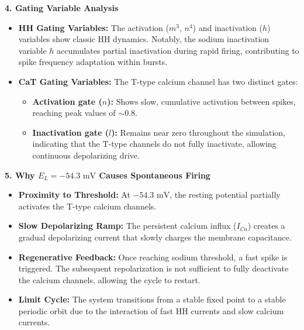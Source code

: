\documentclass{article}
\begin{document}
\begin{answerbox}
\textbf{4. Gating Variable Analysis}
\begin{itemize}
    \item \textbf{HH Gating Variables:} The activation ($m^3$, $n^4$) and inactivation ($h$) variables show classic HH dynamics. Notably, the sodium inactivation variable $h$ accumulates partial inactivation during rapid firing, contributing to spike frequency adaptation within bursts.
    \item \textbf{CaT Gating Variables:} The T-type calcium channel has two distinct gates:
    \begin{itemize}
        \item \textbf{Activation gate ($n$):} Shows slow, cumulative activation between spikes, reaching peak values of $\sim 0.8$.
        \item \textbf{Inactivation gate ($l$):} Remains near zero throughout the simulation, indicating that the T-type channels do not fully inactivate, allowing continuous depolarizing drive.
    \end{itemize}
\end{itemize}

\textbf{5. Why $E_L = -54.3 \text{ mV}$ Causes Spontaneous Firing}
\begin{itemize}
    \item \textbf{Proximity to Threshold:} At $-54.3 \text{ mV}$, the resting potential partially activates the T-type calcium channels.
    \item \textbf{Slow Depolarizing Ramp:} The persistent calcium influx ($I_{Ca}$) creates a gradual depolarizing current that slowly charges the membrane capacitance.
    \item \textbf{Regenerative Feedback:} Once reaching sodium threshold, a fast spike is triggered. The subsequent repolarization is not sufficient to fully deactivate the calcium channels, allowing the cycle to restart.
    \item \textbf{Limit Cycle:} The system transitions from a stable fixed point to a stable periodic orbit due to the interaction of fast HH currents and slow calcium currents.
\end{itemize}


\end{answerbox}
\end{document}
